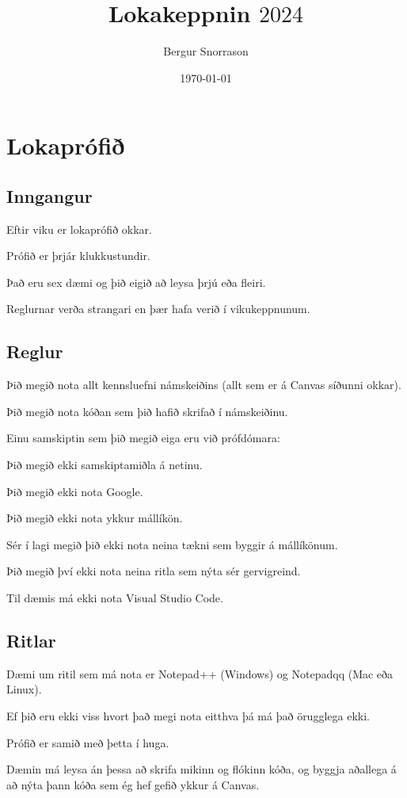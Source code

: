 \title{Lokakeppnin $2024$}
\author{Bergur Snorrason}
\date{\today}



\frame{\titlepage}

\section{Lokaprófið}
\subsection{Inngangur}
{
    {
        \item<1-> Eftir viku er lokaprófið okkar.
        \item<2-> Prófið er þrjár klukkustundir.
        \item<3-> Það eru sex dæmi og þið eigið að leysa þrjú eða fleiri.
        \item<4-> Reglurnar verða strangari en þær hafa verið í vikukeppnunum.
    }
}

\subsection{Reglur}
{
    {
        \item<1-> Þið megið nota allt kennsluefni námskeiðins (allt sem er á Canvas síðunni okkar).
        \item<2-> Þið megið nota kóðan sem þið hafið skrifað í námskeiðinu.
        \item<3-> Einu samskiptin sem þið megið eiga eru við prófdómara:
        {
            \item<4-> Þið megið ekki samskiptamiðla á netinu.
            \item<5-> Þið megið ekki nota Google.
            \item<6-> Þið megið ekki nota ykkur mállíkön.
        }
        \item<7-> Sér í lagi megið þið ekki nota neina tækni sem byggir á mállíkönum.
        \item<8-> Þið megið því ekki nota neina ritla sem nýta sér gervigreind.
        \item<9-> Til dæmis má ekki nota Visual Studio Code.
    }
}

\subsection{Ritlar}
{
    {
        \item<1-> Dæmi um ritil sem má nota er Notepad++ (Windows) og Notepadqq (Mac eða Linux).
        \item<2-> Ef þið eru ekki viss hvort það megi nota eitthva þá má það örugglega ekki.
        \item<3-> Prófið er samið með þetta í huga.
        \item<4-> Dæmin má leysa án þessa að skrifa mikinn og flókinn kóða, og byggja aðallega á að nýta þann kóða sem ég hef gefið ykkur á Canvas.
    }
}

